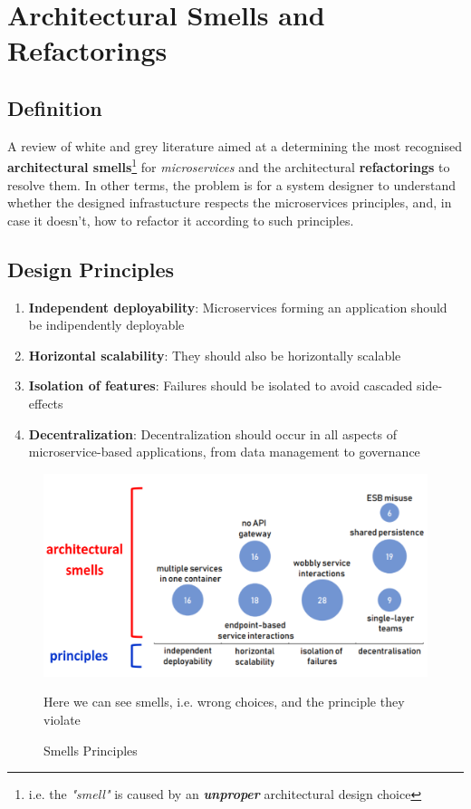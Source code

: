 \chapter{Architectural Smells and Refactorings}
\section{Definition}
A review of white and grey literature aimed at a determining the most recognised \textbf{architectural smells}\footnote{i.e. the \textit{"smell"} is caused by an \textbf{\textit{unproper}} architectural design choice} for \textit{microservices} and the architectural \textbf{refactorings} to resolve them.
In other terms, the problem is for a system designer to understand whether the designed infrastucture respects the microservices principles,
and, in case it doesn't, how to refactor it according to such principles.

\section{Design Principles}
\begin{enumerate}
   \item \textbf{Independent deployability}:
   Microservices forming an application should be indipendently deployable
   \item \textbf{Horizontal scalability}:
   They should also be horizontally scalable
   \item \textbf{Isolation of features}:
   Failures should be isolated to avoid cascaded side-effects
   \item \textbf{Decentralization}:
   Decentralization should occur in all aspects of microservice-based applications,
   from data management to governance
\end{enumerate}

\begin{figure}[htbp]
   \centering
   \includegraphics{images/smells_principles.png}
   \caption{Smells Principles}
   Here we can see smells, i.e. wrong choices, and the principle they violate
   \label{fig:smells_principles}
\end{figure}

